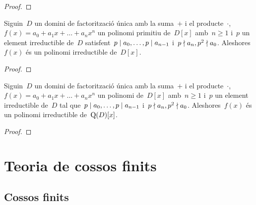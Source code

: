 \documentclass[../../main.tex]{subfiles}
\begin{document}
    \begin{proof}
    \end{proof}
    \begin{theorem}
        \label{thm:Criteri-dEisenstein}
        Siguin~\(D\) un domini de factorització única amb la suma~\(+\) i el producte~\(\cdot\),~\(f(x)=a_{0}+a_{1}x+\dots+a_{n}x^{n}\) un polinomi primitiu de~\(D[x]\) amb~\(n\geq1\) i~\(p\) un element irreductible de~\(D\) satisfent~\(p\mathrel{|} a_{0},\dots,p\mathrel{|} a_{n-1}\) i~\(p\mathrel{\nmid} a_{n},p^{2}\mathrel{\nmid} a_{0}\).
        Aleshores~\(f(x)\) és un polinomi irreductible de~\(D[x]\).
    \end{theorem}
    \begin{proof}
    \end{proof}
    \begin{corollary}
        Siguin~\(D\) un domini de factorització única amb la suma~\(+\) i el producte~\(\cdot\),~\(f(x)=a_{0}+a_{1}x+\dots+a_{n}x^{n}\) un polinomi de~\(D[x]\) amb~\(n\geq1\) i~\(p\) un element irreductible de~\(D\) tal que~\(p\mathrel{|} a_{0},\dots,p\mathrel{|} a_{n-1}\) i~\(p\mathrel{\nmid} a_{n},p^{2}\mathrel{\nmid} a_{0}\).
        Aleshores~\(f(x)\) és un polinomi irreductible de~\(\operatorname{Q}(D)[x]\).
    \end{corollary}
    \begin{proof}
    \end{proof}
\chapter{Teoria de cossos finits}
\section{Cossos finits}
\end{document}
